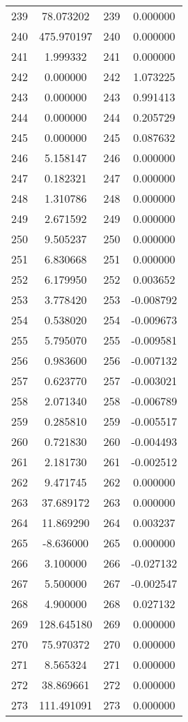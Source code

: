 \documentclass[12pt]{article}
\begin{document}
\begin{longtable}{@{}cccc@{}}
239 & 78.073202 & 239 & 0.000000 \\
240 & 475.970197 & 240 & 0.000000 \\
241 & 1.999332 & 241 & 0.000000 \\
242 & 0.000000 & 242 & 1.073225 \\
243 & 0.000000 & 243 & 0.991413 \\
244 & 0.000000 & 244 & 0.205729 \\
245 & 0.000000 & 245 & 0.087632 \\
246 & 5.158147 & 246 & 0.000000 \\
247 & 0.182321 & 247 & 0.000000 \\
248 & 1.310786 & 248 & 0.000000 \\
249 & 2.671592 & 249 & 0.000000 \\
250 & 9.505237 & 250 & 0.000000 \\
251 & 6.830668 & 251 & 0.000000 \\
252 & 6.179950 & 252 & 0.003652 \\
253 & 3.778420 & 253 & -0.008792 \\
254 & 0.538020 & 254 & -0.009673 \\
255 & 5.795070 & 255 & -0.009581 \\
256 & 0.983600 & 256 & -0.007132 \\
257 & 0.623770 & 257 & -0.003021 \\
258 & 2.071340 & 258 & -0.006789 \\
259 & 0.285810 & 259 & -0.005517 \\
260 & 0.721830 & 260 & -0.004493 \\
261 & 2.181730 & 261 & -0.002512 \\
262 & 9.471745 & 262 & 0.000000 \\
263 & 37.689172 & 263 & 0.000000 \\
264 & 11.869290 & 264 & 0.003237 \\
265 & -8.636000 & 265 & 0.000000 \\
266 & 3.100000 & 266 & -0.027132 \\
267 & 5.500000 & 267 & -0.002547 \\
268 & 4.900000 & 268 & 0.027132 \\
269 & 128.645180 & 269 & 0.000000 \\
270 & 75.970372 & 270 & 0.000000 \\
271 & 8.565324 & 271 & 0.000000 \\
272 & 38.869661 & 272 & 0.000000 \\
273 & 111.491091 & 273 & 0.000000 \\

\end{longtable}
\end{document}

